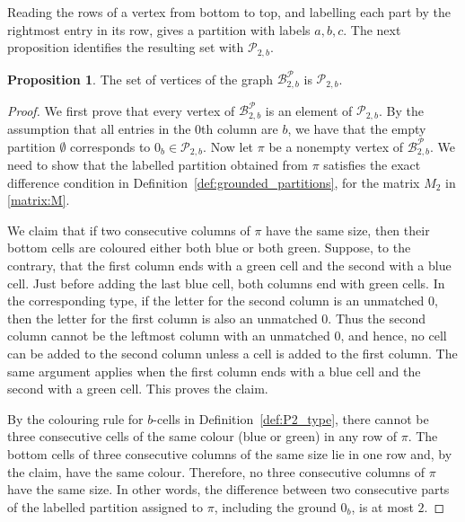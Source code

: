 \documentclass[11pt]{article}
\theoremstyle{definition}
\newtheorem{proposition}[theorem]{Proposition}
\theoremstyle{remark}
\theoremstyle{definition}
\numberwithin{equation}{section}
\begin{document}
Reading the rows of a vertex from bottom to top, and labelling each
part by the rightmost entry in its row, gives a partition with labels
\( a,b,c \). The next proposition identifies the resulting set with
\( \mathcal{P}_{2,b} \).

\begin{proposition}\label{prop:vertices_P2_crystal}
The set of vertices of the graph $\mathcal{B}_{2,b}^{\mathcal{P}}$ is $\mathcal{P}_{2,b}$.
\end{proposition}
\begin{proof}
  We first prove that every vertex of
  \(\mathcal{B}_{2,b}^{\mathcal{P}}\) is an element of
  \(\mathcal{P}_{2,b}\). By the assumption that all entries in the
  \( 0 \)th column are \( b \), we have that the empty
  partition \( \emptyset \) corresponds to
  \( 0_b \in \mathcal{P}_{2,b} \). Now let \(\pi\) be a nonempty vertex
  of \(\mathcal{B}_{2,b}^{\mathcal{P}}\). We need to show that the labelled partition obtained from \( \pi \) satisfies the exact difference condition in Definition~\ref{def:grounded_partitions}, for the matrix \( M_2 \) in \eqref{matrix:M}.

  We claim that if two consecutive columns of \(\pi\) have the same
  size, then their bottom cells are coloured either both blue or both
  green. Suppose, to the contrary, that the first column ends with a
  green cell and the second with a blue cell. Just before adding the
  last blue cell, both columns end with green cells. In the
  corresponding type, if the letter for the second column is an
  unmatched \( 0 \), then the letter for the first column is also an
  unmatched \( 0 \). Thus the second column cannot be the leftmost
  column with an unmatched \( 0 \), and hence, no cell can be added to
  the second column unless a cell is added to the first column. The
  same argument applies when the first column ends with a blue cell
  and the second with a green cell. This proves the claim.
  

  By the colouring rule for \( b \)-cells in Definition~\ref{def:P2_type}, there
  cannot be three consecutive cells of the same colour (blue or green)
  in any row of \(\pi\). The bottom cells of three consecutive columns of the same size lie in one row and, by the claim, have the same colour. Therefore, no three consecutive columns of $\pi$ have the same size. In other words, the difference between two consecutive parts of the labelled partition assigned to \(\pi\), including the ground \(0_b\), is at most \(2\).



\end{proof}
\end{document}
